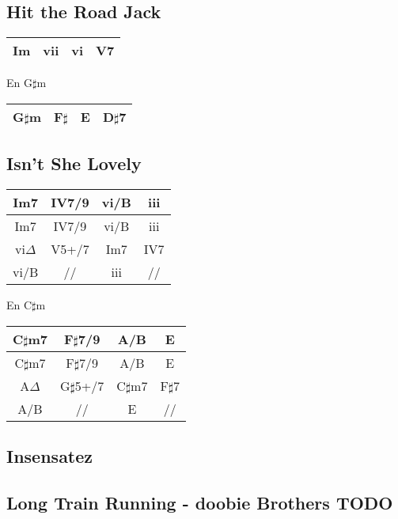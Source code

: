 \documentclass[a4paper,10pt]{article}
\begin{document}
\subsection{Hit the Road Jack}
\begin{tabular}{ | c | c | c | c | } \hline			
	Im & vii & vi & V7 \\ \hline  
\end{tabular}
\newline
\newline

En G$\sharp$m

\begin{tabular}{ | c | c | c | c | } \hline			
	G$\sharp$m & F$\sharp$ & E & D$\sharp$7 \\ \hline  
\end{tabular}
\newpage

\subsection{Isn't She Lovely}

\begin{tabular}{ | c | c | c | c | } \hline			
	Im7 & IV7/9 & vi/B & iii \\ \hline  
	Im7 & IV7/9 & vi/B & iii \\ \hline  
	vi$\Delta$ & V5+/7 & Im7 & IV7 \\ \hline  
	vi/B & // & iii & // \\ \hline  
\end{tabular}
\newline
\newline

En C$\sharp$m

\begin{tabular}{ | c | c | c | c | } \hline			
	C$\sharp$m7 & F$\sharp$7/9 & A/B & E \\ \hline  
	C$\sharp$m7 & F$\sharp$7/9 & A/B & E \\ \hline  
	A$\Delta$ & G$\sharp$5+/7 & C$\sharp$m7 & F$\sharp$7 \\ \hline  
	A/B & // & E & // \\ \hline  
\end{tabular}
\newpage

\subsection{Insensatez}
\newpage

\subsection{Long Train Running - doobie Brothers TODO}
\newpage
\end{document}

